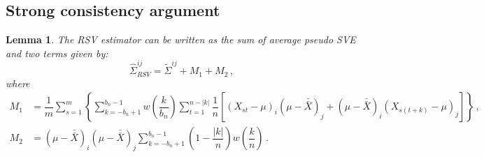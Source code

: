 \documentclass[11pt]{article}
\newtheorem{lemma}{Lemma}
\theoremstyle{remark}
\begin{document}
\subsection{Strong consistency argument} \label{appendix:strong_consis}

\begin{lemma} \label{lemma:rsv_breakdown}
    The RSV estimator can be written as the sum of average pseudo SVE and two terms given by:
    \[
    \hat{\Sigma}_{RSV}^{ij} = \tilde{\Sigma}^{ij} + M_1 + M_2\,,
    \]
    where 
\begin{align*}
  M_1 & = \dfrac{1}{m}\sum\limits_{s=1}^{m}\left\{\sum\limits_{k=-b_n+1}^{b_n-1}w\left(\dfrac{k}{b_n}\right)\sum\limits_{t=1}^{n-|k|}\dfrac{1}{n}\left[ \left(X_{st}-\mu \right)_i   \left(\mu-\bar{\bar{X}} \right)_j +    \left(\mu-\bar{\bar{X}} \right)_i  \left(X_{s(t+k)}-\mu \right)_j \right]\right\}\,, \\ 
M_2 &= \left(\mu-\bar{\bar{X}} \right)_i   \left(\mu-\bar{\bar{X}} \right)_j\sum\limits_{k=-b_n+1}^{b_n-1}\left(1-\dfrac{|k|}{n}\right)w\left(\dfrac{k}{n}\right)\,.
\end{align*}
\end{lemma}
\end{document}
